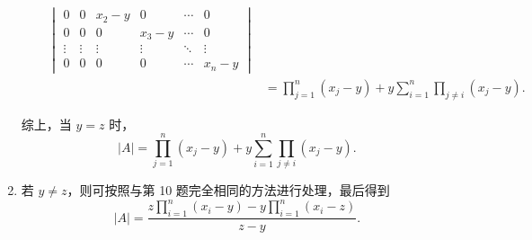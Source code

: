 \begin{exercise}
\begin{exgroup}
\begin{answer}
\begin{enumerate}
\begin{enumerate}
\begin{align*}
\begin{vmatrix}
                                        0                                & 0      & x_2-y  & 0      & \cdots & 0      \\
                                        0                                & 0      & 0      & x_3-y  & \cdots & 0      \\
                                        \vdots                           & \vdots & \vdots & \vdots & \ddots & \vdots \\
                                        0                                & 0      & 0      & 0      & \cdots & x_n-y
                                    \end{vmatrix} \\
                                    &= \prod_{j=1}^n (x_j - y) + y\sum_{i=1}^n \prod_{j \neq i} (x_j - y).
                                \end{align*}
                    \end{enumerate}
                    综上，当 $y = z$ 时，
                    \[
                        |A| = \prod_{j=1}^n (x_j - y) + y\sum_{i=1}^n \prod_{j \neq i} (x_j - y).
                    \]

                \item 若 $y \neq z$，则可按照与第 10 题完全相同的方法进行处理，最后得到
                    \[
                        |A| = \frac{z \prod_{i=1}^n (x_i - y) - y \prod_{i=1}^n (x_i - z)}{z - y}.
                    \]
            \end{enumerate}
        \end{answer}
    \end{exgroup}
\end{exercise}
